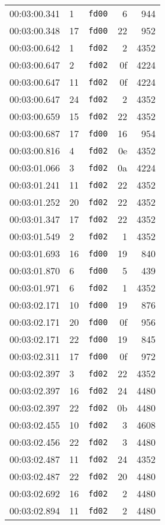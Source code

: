 \documentclass{article}
\begin{document}
\begin{longtable}{lllrr}
00:03:00.341 & 1 & \texttt{fd00} & 6 & 944 \\
00:03:00.348 & 17 & \texttt{fd00} & 22 & 952 \\
00:03:00.642 & 1 & \texttt{fd02} & 2 & 4352 \\
00:03:00.647 & 2 & \texttt{fd02} & 0f & 4224 \\
00:03:00.647 & 11 & \texttt{fd02} & 0f & 4224 \\
00:03:00.647 & 24 & \texttt{fd02} & 2 & 4352 \\
00:03:00.659 & 15 & \texttt{fd02} & 22 & 4352 \\
00:03:00.687 & 17 & \texttt{fd00} & 16 & 954 \\
00:03:00.816 & 4 & \texttt{fd02} & 0e & 4352 \\
00:03:01.066 & 3 & \texttt{fd02} & 0a & 4224 \\
00:03:01.241 & 11 & \texttt{fd02} & 22 & 4352 \\
00:03:01.252 & 20 & \texttt{fd02} & 22 & 4352 \\
00:03:01.347 & 17 & \texttt{fd02} & 22 & 4352 \\
00:03:01.549 & 2 & \texttt{fd02} & 1 & 4352 \\
00:03:01.693 & 16 & \texttt{fd00} & 19 & 840 \\
00:03:01.870 & 6 & \texttt{fd00} & 5 & 439 \\
00:03:01.971 & 6 & \texttt{fd02} & 1 & 4352 \\
00:03:02.171 & 10 & \texttt{fd00} & 19 & 876 \\
00:03:02.171 & 20 & \texttt{fd00} & 0f & 956 \\
00:03:02.171 & 22 & \texttt{fd00} & 19 & 845 \\
00:03:02.311 & 17 & \texttt{fd00} & 0f & 972 \\
00:03:02.397 & 3 & \texttt{fd02} & 22 & 4352 \\
00:03:02.397 & 16 & \texttt{fd02} & 24 & 4480 \\
00:03:02.397 & 22 & \texttt{fd02} & 0b & 4480 \\
00:03:02.455 & 10 & \texttt{fd02} & 3 & 4608 \\
00:03:02.456 & 22 & \texttt{fd02} & 3 & 4480 \\
00:03:02.487 & 11 & \texttt{fd02} & 24 & 4352 \\
00:03:02.487 & 22 & \texttt{fd02} & 20 & 4480 \\
00:03:02.692 & 16 & \texttt{fd02} & 2 & 4480 \\
00:03:02.894 & 11 & \texttt{fd02} & 2 & 4480 \\

\end{longtable}
\end{document}
